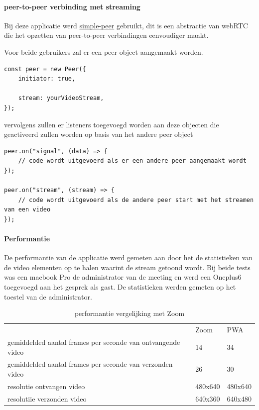 		\paragraph{peer-to-peer verbinding met streaming}
			Bij deze applicatie werd \href{https://github.com/feross/simple-peer}{simple-peer} gebruikt, dit is een abstractie van webRTC die het opzetten van peer-to-peer verbindingen eenvoudiger maakt.
			
			Voor beide gebruikers zal er een peer object aangemaakt worden.

\begin{lstlisting}
const peer = new Peer({
	initiator: true,

	stream: yourVideoStream,
});
\end{lstlisting}
			
			vervolgens zullen er listeners toegevoegd worden aan deze objecten die geactiveerd zullen worden op basis van het andere peer object
			
\begin{lstlisting}
peer.on("signal", (data) => {
	// code wordt uitgevoerd als er een andere peer aangemaakt wordt
});

peer.on("stream", (stream) => {
	// code wordt uitgevoerd als de andere peer start met het streamen van een video
});
\end{lstlisting}

		\paragraph{Performantie}
		
			De performantie van de applicatie werd gemeten aan door het de statistieken van de video elementen op te halen waarint de stream getoond wordt. Bij beide tests was een macbook Pro de administrator van de meeting en werd een Oneplus6 toegevoegd aan het gesprek als gast. De statistieken werden gemeten op het toestel van de administrator.
			
			\begin{table}[H]
			\centering
			\begin{tabular}{lll}													& Zoom 			& PWA \\
				gemiddelded aantal frames per seconde van ontvangende video 	 & 14				&  34 \\
				gemiddelded aantal frames per seconde van verzonden video		   & 26				   & 30	 \\
				resolutie ontvangen video  						  & 480x640 	&  480x640  \\
				resolutiie verzonden video						   & 640x360	& 	640x480\\
			\end{tabular}	
			\caption{performantie vergelijking met Zoom}
			\end{table}
	

